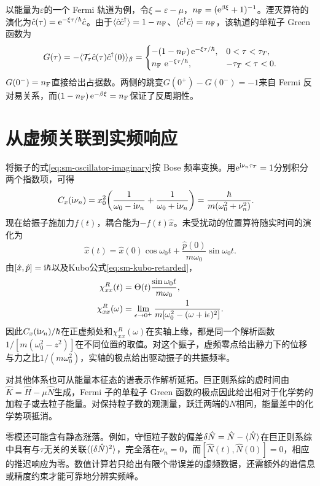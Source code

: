以能量为$\varepsilon$的一个 Fermi 轨道为例，令$\xi = \varepsilon - \mu$，$n_\mathrm F = (\mathop{}\!\mathrm{e}^{\beta\xi} + 1)^{-1}$。湮灭算符的演化为$\hat c(\tau) = \mathop{}\!\mathrm{e}^{-\xi\tau/\hbar}\hat c$。由于$\langle\hat c\hat c^\dagger\rangle = 1 - n_\mathrm F$、$\langle\hat c^\dagger\hat c\rangle = n_\mathrm F$，该轨道的单粒子 Green 函数为
\begin{equation}
	\label{eq:sm-fermion-imaginary-time-green}
	G(\tau) = -\langle\mathcal T_\tau\hat c(\tau)\hat c^\dagger(0)\rangle_\beta
	= \begin{cases}
		-(1 - n_\mathrm F)\mathop{}\!\mathrm{e}^{-\xi\tau/\hbar},&0 < \tau < \tau_T,\\
		n_\mathrm F\,\mathop{}\!\mathrm{e}^{-\xi\tau/\hbar},&-\tau_T < \tau < 0 .
	\end{cases}
\end{equation}
$G(0^-) = n_\mathrm F$直接给出占据数。两侧的跳变$G(0^+) - G(0^-) = -1$来自 Fermi 反对易关系，而$(1 - n_\mathrm F)\mathop{}\!\mathrm{e}^{-\beta\xi} = n_\mathrm F$保证了反周期性。

\section{从虚频关联到实频响应}
将振子的式\eqref{eq:sm-oscillator-imaginary}按 Bose 频率变换。用$\mathop{}\!\mathrm{e}^{\mathrm{i}\nu_n\tau_T} = 1$分别积分两个指数项，可得
\begin{align}
	C_x(\mathrm{i}\nu_n)
	&= x_0^2\biggl(\frac1{\omega_0 - \mathrm{i}\nu_n} + \frac1{\omega_0 + \mathrm{i}\nu_n}\biggr)
	= \frac{\hbar}{m(\omega_0^2 + \nu_n^2)} .
\end{align}
现在给振子施加力$f(t)$，耦合能为$-f(t)\hat x$。未受扰动的位置算符随实时间的演化为
\[
	\hat x(t) = \hat x(0)\cos\omega_0t + \frac{\hat p(0)}{m\omega_0}\sin\omega_0t .
\]
由$[\hat x,\hat p] = \mathrm{i}\hbar$以及Kubo公式\eqref{eq:sm-kubo-retarded}，
\begin{subequations}
	\label{eq:sm-oscillator-retarded-response}
	\begin{align}
		\chi^R_{xx}(t) &= \Theta(t)\frac{\sin\omega_0t}{m\omega_0},\\
		\chi^R_{xx}(\omega)
		&= \lim_{\epsilon\to0^+}\frac1{m[\omega_0^2 - (\omega + \mathrm{i}\epsilon)^2]} .
	\end{align}
\end{subequations}
因此$C_x(\mathrm{i}\nu_n)/\hbar$在正虚频处和$\chi^R_{xx}(\omega)$在实轴上缘，都是同一个解析函数$1/[m(\omega_0^2 - z^2)]$在不同位置的取值。对这个振子，虚频零点给出静力下的位移与力之比$1/(m\omega_0^2)$，实轴的极点给出驱动振子的共振频率。

对其他体系也可从能量本征态的谱表示作解析延拓。巨正则系综的虚时间由$\hat K = \hat H - \mu\hat N$生成，Fermi 子的单粒子 Green 函数的极点因此给出相对于化学势的加粒子或去粒子能量。对保持粒子数的观测量，跃迁两端的$N$相同，能量差中的化学势项抵消。

零模还可能含有静态涨落。例如，守恒粒子数的偏差$\delta\hat N = \hat N - \langle\hat N\rangle$在巨正则系综中具有与$\tau$无关的关联$\langle(\delta\hat N)^2\rangle$，完全落在$\nu_n = 0$，而$[\hat N(t),\hat N(0)] = 0$，相应的推迟响应为零。数值计算若只给出有限个带误差的虚频数据，还需额外的谱信息或精度约束才能可靠地分辨实频峰。
